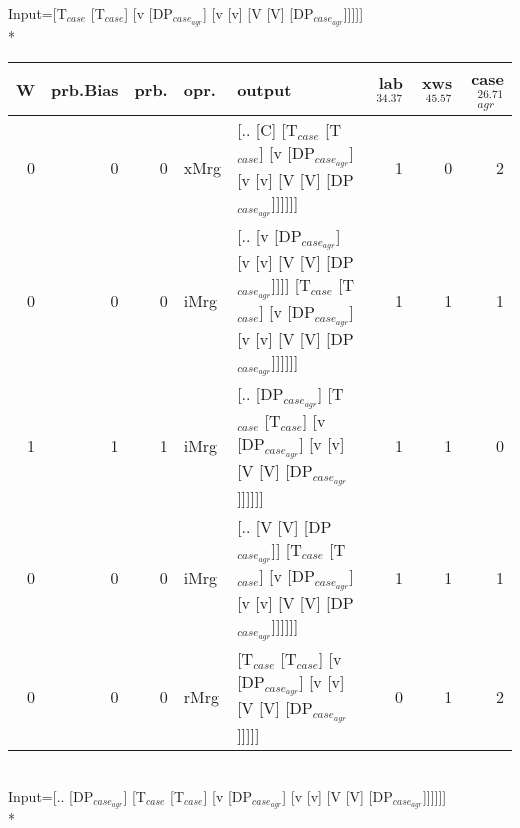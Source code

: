 \begingroup\scriptsize Input=[T$_{case}$ [T$_{case}$] [v [DP$_{case_{agr}}$] [v [v] [V [V] [DP$_{case_{agr}}$]]]]]\\*
\begin{tabularx}{\linewidth}{rrrlXrrr}
\hline
   W &   prb.Bias &   prb. & opr.   & output                                                                                                                 &   lab$^{34.37}$ &   xws$^{45.57}$ &   case$_{agr}^{26.71}$ \\
\hline
   0 &       0 &   0 & xMrg & [.. [C] [T$_{case}$ [T$_{case}$] [v [DP$_{case_{agr}}$] [v [v] [V [V] [DP$_{case_{agr}}$]]]]]]                                             &             1 &             0 &                  2 \\
   0 &       0 &   0 & iMrg & [.. [v [DP$_{case_{agr}}$] [v [v] [V [V] [DP$_{case_{agr}}$]]]] [T$_{case}$ [T$_{case}$] [v [DP$_{case_{agr}}$] [v [v] [V [V] [DP$_{case_{agr}}$]]]]]] &             1 &             1 &                  1 \\
   1 &       1 &   1 & iMrg & [.. [DP$_{case_{agr}}$] [T$_{case}$ [T$_{case}$] [v [DP$_{case_{agr}}$] [v [v] [V [V] [DP$_{case_{agr}}$]]]]]]                                   &             1 &             1 &                  0 \\
   0 &       0 &   0 & iMrg & [.. [V [V] [DP$_{case_{agr}}$]] [T$_{case}$ [T$_{case}$] [v [DP$_{case_{agr}}$] [v [v] [V [V] [DP$_{case_{agr}}$]]]]]]                           &             1 &             1 &                  1 \\
   0 &       0 &   0 & rMrg & [T$_{case}$ [T$_{case}$] [v [DP$_{case_{agr}}$] [v [v] [V [V] [DP$_{case_{agr}}$]]]]]                                                      &             0 &             1 &                  2 \\
\hline
\end{tabularx}\endgroup\\
\begingroup\scriptsize Input=[.. [DP$_{case_{agr}}$] [T$_{case}$ [T$_{case}$] [v [DP$_{case_{agr}}$] [v [v] [V [V] [DP$_{case_{agr}}$]]]]]]\\*
